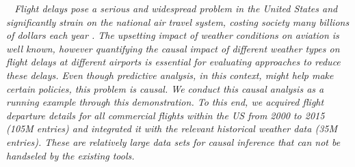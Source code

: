 \begin{example} \em \delay \ \em
Flight delays pose a serious and widespread problem in the United States and
 significantly strain on the national air travel system, costing society many billions of dollars each year \cite{ball2010total}.
The upsetting impact of weather conditions on aviation is well known, however quantifying
  the causal impact of different weather types on flight delays at different airports is essential for evaluating
  approaches to reduce these delays.
Even though predictive analysis, in this context, might help make certain policies, this problem is causal.
We conduct this causal analysis as a running example through this demonstration.
To this end, we acquired flight departure details for all commercial flights within the US from 2000 to 2015
  (105M entries) and integrated it with the relevant historical weather data (35M entries).
These are relatively large data sets for causal inference that can not be handseled by the existing tools.
\end{example}


